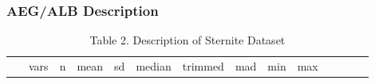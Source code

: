 \subsubsection{AEG/ALB Description}\label{aegalb-description}

\begin{Shaded}
\begin{Highlighting}[]
\NormalTok{(}\NormalTok{(sternite[,}\NormalTok{:}\NormalTok{]), } \NormalTok{, } \NormalTok{)}
\end{Highlighting}
\end{Shaded}

\begin{longtable}[]{@{}cccccccccccccc@{}}
\caption{Table 2. Description of Sternite Dataset}\tabularnewline
\toprule
\begin{minipage}[b]{0.07\columnwidth}\centering\strut
~\strut
\end{minipage} & \begin{minipage}[b]{0.04\columnwidth}\centering\strut
vars\strut
\end{minipage} & \begin{minipage}[b]{0.04\columnwidth}\centering\strut
n\strut
\end{minipage} & \begin{minipage}[b]{0.05\columnwidth}\centering\strut
mean\strut
\end{minipage} & \begin{minipage}[b]{0.05\columnwidth}\centering\strut
sd\strut
\end{minipage} & \begin{minipage}[b]{0.05\columnwidth}\centering\strut
median\strut
\end{minipage} & \begin{minipage}[b]{0.05\columnwidth}\centering\strut
trimmed\strut
\end{minipage} & \begin{minipage}[b]{0.05\columnwidth}\centering\strut
mad\strut
\end{minipage} & \begin{minipage}[b]{0.03\columnwidth}\centering\strut
min\strut
\end{minipage} & \begin{minipage}[b]{0.03\columnwidth}\centering\strut
max\strut
\end{minipage} & \begin{minipage}[b]{0.04\columnwidth}\centering\strut

\end{minipage}
\end{longtable}
